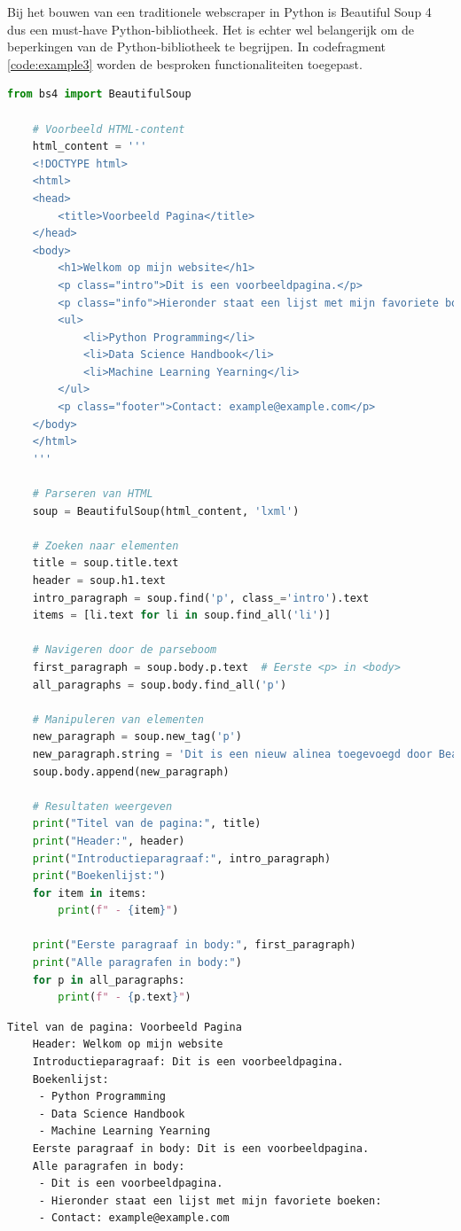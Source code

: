Bij het bouwen van een traditionele webscraper  in Python is Beautiful Soup 4 dus een must-have Python-bibliotheek. Het is echter wel belangerijk om de beperkingen van de Python-bibliotheek te begrijpen. In codefragment \ref{code:example3} worden de besproken functionaliteiten toegepast.


\begin{lstlisting}[language=python, captionpos=b, caption=Een voorbeeld van de kernfunctionaliteiten van Beautiful Soup 4, label={code:example3}]
    from bs4 import BeautifulSoup

    # Voorbeeld HTML-content
    html_content = '''
    <!DOCTYPE html>
    <html>
    <head>
        <title>Voorbeeld Pagina</title>
    </head>
    <body>
        <h1>Welkom op mijn website</h1>
        <p class="intro">Dit is een voorbeeldpagina.</p>
        <p class="info">Hieronder staat een lijst met mijn favoriete boeken:</p>
        <ul>
            <li>Python Programming</li>
            <li>Data Science Handbook</li>
            <li>Machine Learning Yearning</li>
        </ul>
        <p class="footer">Contact: example@example.com</p>
    </body>
    </html>
    '''

    # Parseren van HTML
    soup = BeautifulSoup(html_content, 'lxml')

    # Zoeken naar elementen
    title = soup.title.text
    header = soup.h1.text
    intro_paragraph = soup.find('p', class_='intro').text
    items = [li.text for li in soup.find_all('li')]

    # Navigeren door de parseboom
    first_paragraph = soup.body.p.text  # Eerste <p> in <body>
    all_paragraphs = soup.body.find_all('p')

    # Manipuleren van elementen
    new_paragraph = soup.new_tag('p')
    new_paragraph.string = 'Dit is een nieuw alinea toegevoegd door Beautiful Soup.'
    soup.body.append(new_paragraph)

    # Resultaten weergeven
    print("Titel van de pagina:", title)
    print("Header:", header)
    print("Introductieparagraaf:", intro_paragraph)
    print("Boekenlijst:")
    for item in items:
        print(f" - {item}")

    print("Eerste paragraaf in body:", first_paragraph)
    print("Alle paragrafen in body:")
    for p in all_paragraphs:
        print(f" - {p.text}")
\end{lstlisting}

\begin{lstlisting}[caption={De output van code fragment \ref{code:example3}}, label={outuput:example1}]
    Titel van de pagina: Voorbeeld Pagina
    Header: Welkom op mijn website
    Introductieparagraaf: Dit is een voorbeeldpagina.
    Boekenlijst:
     - Python Programming
     - Data Science Handbook
     - Machine Learning Yearning
    Eerste paragraaf in body: Dit is een voorbeeldpagina.
    Alle paragrafen in body:
     - Dit is een voorbeeldpagina.
     - Hieronder staat een lijst met mijn favoriete boeken:
     - Contact: example@example.com
\end{lstlisting}


